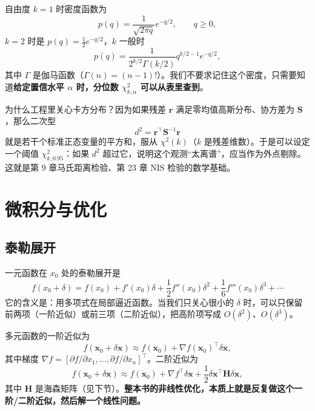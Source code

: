 自由度 $k=1$ 时密度函数为
\begin{equation}
p(q)=\frac{1}{\sqrt{2\pi q}}e^{-q/2},\qquad q\ge 0,
\end{equation}
$k=2$ 时是 $p(q)=\frac12 e^{-q/2}$，$k$ 一般时
\begin{equation}
p(q)=\frac{1}{2^{k/2}\Gamma(k/2)}q^{k/2-1}e^{-q/2},
\end{equation}
其中 $\Gamma$ 是伽马函数（$\Gamma(n)=(n-1)!$）。我们不要求记住这个密度，只需要知道\textbf{给定置信水平 $\alpha$ 时，分位数 $\chi^{2}_{k,\alpha}$ 可以从表里查到}。

为什么工程里关心卡方分布？因为如果残差 $\bm{r}$ 满足零均值高斯分布、协方差为 $\bm{S}$，那么二次型
\begin{equation}
d^{2}=\bm{r}^{\top}\bm{S}^{-1}\bm{r}
\end{equation}
就是若干个标准正态变量的平方和，服从 $\chi^{2}(k)$（$k$ 是残差维数）。于是可以设定一个阈值 $\chi^{2}_{k,0.95}$：如果 $d^{2}$ 超过它，说明这个观测“太离谱”，应当作为外点剔除。这就是第 9 章马氏距离检验、第 23 章 NIS 检验的数学基础。

\section{微积分与优化}\label{sec:02-opt}

\subsection{泰勒展开}

一元函数在 $x_0$ 处的泰勒展开是
\begin{equation}
f(x_0+\delta)=f(x_0)+f'(x_0)\delta+\frac{1}{2}f''(x_0)\delta^{2}+\frac{1}{6}f'''(x_0)\delta^{3}+\cdots
\label{eq:02-taylor}
\end{equation}
它的含义是：用多项式在局部逼近函数。当我们只关心很小的 $\delta$ 时，可以只保留前两项（一阶近似）或前三项（二阶近似），把高阶项写成 $O(\delta^{2})$、$O(\delta^{3})$。

多元函数的一阶近似为
\begin{equation}
f(\bm{x}_0+\delta\bm{x})\approx f(\bm{x}_0)+\nabla f(\bm{x}_0)^{\top}\delta\bm{x},
\end{equation}
其中梯度 $\nabla f=\left[\partial f/\partial x_1,\dots,\partial f/\partial x_n\right]^{\top}$。二阶近似为
\begin{equation}
f(\bm{x}_0+\delta\bm{x})\approx f(\bm{x}_0)+\nabla f^{\top}\delta\bm{x}+\frac12\delta\bm{x}^{\top}\bm{H}\delta\bm{x},
\end{equation}
其中 $\bm{H}$ 是海森矩阵（见下节）。\textbf{整本书的非线性优化，本质上就是反复做这个一阶/二阶近似，然后解一个线性问题。}

